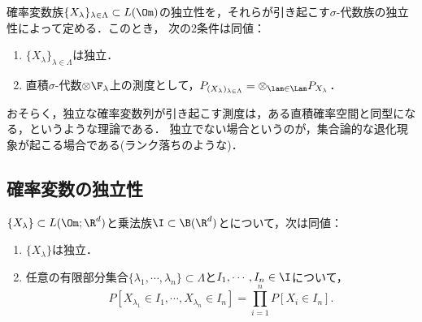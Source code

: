 \documentclass[uplatex,dvipdfmx]{jsreport}
\begin{document}
\begin{proposition}[測度の独立性の直積による特徴付け]
    確率変数族$\{X_\lambda\}_{\lambda\in\Lambda}\subset L(\Om)$の独立性を，それらが引き起こす$\sigma$-代数族の独立性によって定める．このとき，
    次の2条件は同値：
    \begin{enumerate}
        \item $\{X_\lambda\}_{\lambda\in\Lambda}$は独立．
        \item 直積$\sigma$-代数$\otimes\F_\lambda$上の測度として，$P_{(X_\lambda)_{\lambda\in\Lambda}}=\otimes_{\lam\in\Lam} P_{X_\lambda}$．
    \end{enumerate}
\end{proposition}
\begin{remarks}
    おそらく，独立な確率変数列が引き起こす測度は，ある直積確率空間と同型になる，というような理論である．
    独立でない場合というのが，集合論的な退化現象が起こる場合である(ランク落ちのような)．
\end{remarks}

\subsection{確率変数の独立性}

\begin{theorem}[独立性の十分条件]\label{thm-sufficient-condition-to-be-independent-rvs}
    $\{X_\lambda\}\subset L(\Om;\R^d)$と乗法族$\I\subset\B(\R^d)$とについて，次は同値：
    \begin{enumerate}
        \item $\{X_\lambda\}$は独立．
        \item 任意の有限部分集合$\{\lambda_1,\cdots,\lambda_n\}\subset\Lambda$と$I_1,\cdots,I_n\in\I$について，
        \[P[X_{\lambda_1}\in I_1,\cdots,X_{\lambda_n}\in I_n]=\prod_{i=1}^nP[X_i\in I_n].\]
    \end{enumerate}
\end{theorem}
\end{document}
